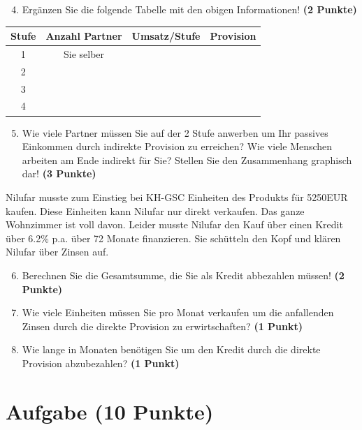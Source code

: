 \documentclass[a4paper, 9pt]{scrartcl}\usepackage[]{graphicx}\usepackage[]{xcolor}
\begin{document}
\begin{enumerate}
  \setcounter{enumi}{3}
\item Ergänzen Sie die folgende Tabelle mit den obigen Informationen! \textbf{(2 Punkte)}
\end{enumerate}

\begin{center}
\begin{tabular}{c|c|c|c}
  \toprule
  \textbf{Stufe} & \textbf{Anzahl Partner}  & \textbf{Umsatz/Stufe} & \textbf{Provision}\\
  \midrule
  1 & Sie selber  &  & \\ \midrule
  2 &   &  &  \\ \midrule
  3 &   &  &  \\ \midrule
  4 &   &  &  \\
  \bottomrule
\end{tabular}
\end{center}

\begin{enumerate}
  \setcounter{enumi}{4}
\item Wie viele Partner müssen Sie auf der 2 Stufe anwerben um Ihr passives Einkommen durch indirekte Provision zu erreichen? Wie viele Menschen arbeiten am Ende indirekt für Sie? Stellen Sie den Zusammenhang graphisch dar!  \textbf{(3 Punkte)}
\end{enumerate}

Nilufar musste zum Einstieg bei KH-GSC Einheiten des Produkts für 5250EUR kaufen. Diese Einheiten kann Nilufar nur direkt verkaufen. Das ganze Wohnzimmer ist voll davon. Leider musste Nilufar den Kauf über einen Kredit über 6.2\% p.a. über 72 Monate finanzieren. Sie schütteln den Kopf und klären Nilufar über Zinsen auf.

\begin{enumerate}
  \setcounter{enumi}{5}
\item Berechnen Sie die Gesamtsumme, die Sie als Kredit abbezahlen müssen! \textbf{(2 Punkte)}
\item Wie viele Einheiten müssen Sie pro Monat verkaufen um die anfallenden Zinsen durch die direkte Provision zu erwirtschaften? \textbf{(1 Punkt)}
\item Wie lange in Monaten benötigen Sie um den Kredit durch die direkte Provision abzubezahlen? \textbf{(1 Punkt)}
\end{enumerate} 
\clearpage

\section{Aufgabe \hfill (10 Punkte)}
\end{document}
